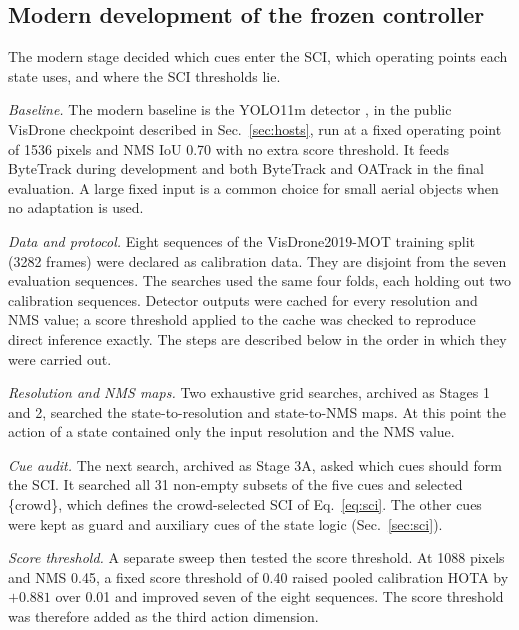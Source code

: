 \documentclass[journal]{new-aiaa}
\begin{document}
\subsection{Modern development of the frozen controller}\label{sec:modern}

The modern stage decided which cues enter the SCI, which operating points
each state uses, and where the SCI thresholds lie.

\emph{Baseline.} The modern baseline is the YOLO11m detector
\cite{jocher2024yolo11}, in the public VisDrone checkpoint described in
Sec.~\ref{sec:hosts}, run at a fixed operating point of 1536 pixels and NMS
IoU 0.70 with no extra score threshold. It feeds ByteTrack
\cite{zhang2022bytetrack} during development and both ByteTrack and OATrack
\cite{qi2026oatrack} in the final evaluation. A large fixed input is a common
choice for small aerial objects when no adaptation is used.

\emph{Data and protocol.} Eight sequences of the VisDrone2019-MOT training split
(3282 frames) were declared as calibration data. They are disjoint from the
seven evaluation sequences. The searches used the same four folds, each
holding out two calibration sequences. Detector outputs were cached for
every resolution and NMS value; a score threshold applied to the cache was
checked to reproduce direct inference exactly. The steps are described below
in the order in which they were carried out.

\emph{Resolution and NMS maps.} Two exhaustive grid searches, archived as
Stages 1 and 2, searched the state-to-resolution and state-to-NMS maps. At
this point the action of a state contained only the input resolution and the
NMS value.

\emph{Cue audit.} The next search, archived as Stage 3A, asked which cues
should form the SCI. It searched
all 31 non-empty subsets of the five cues and selected \{crowd\}, which defines
the crowd-selected SCI of Eq.~\eqref{eq:sci}. The other cues were kept as guard
and auxiliary cues of the state logic (Sec.~\ref{sec:sci}).

\emph{Score threshold.} A separate sweep then tested the score threshold. At
1088 pixels and NMS 0.45, a fixed score threshold of 0.40 raised pooled
calibration HOTA by $+0.881$ over 0.01 and improved seven of the eight
sequences. The score threshold was therefore added as the third action
dimension.
\end{document}
